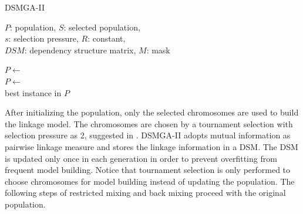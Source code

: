 \documentclass{sig-alternate-05-2015}
\begin{document}
\begin{algorithm}
\caption{DSMGA-II}\label{algo_disjdecomp}


$P$: population, $S$: selected population, \\
$s$: selection pressure, $R$: constant, \\
$DSM$: dependency structure matrix, $M$: mask \\


\BlankLine

$P \leftarrow$  \\
$P \leftarrow$  \\
\Return best instance in $P$
\end{algorithm}

After initializing the population, only the selected chromosomes are used to build the linkage model. The chromosomes are chosen by a tournament selection with　selection pressure as 2, suggested in \cite{yu:population}. DSMGA-II adopts mutual information as pairwise linkage measure and stores the linkage information in a DSM. The DSM is updated only once in each generation in order to prevent overfitting from frequent model building. Notice that tournament selection is only performed to choose chromosomes for model building instead of updating the population. The following steps of restricted mixing and back mixing proceed with the original population.
\end{document}
